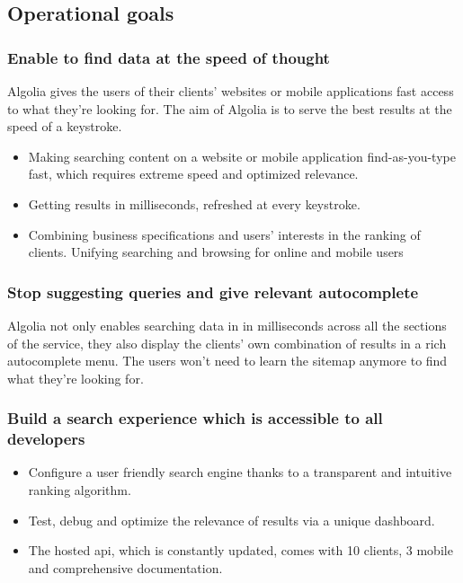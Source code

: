 \subsection{Operational goals}

\subsubsection{Enable to find data at the speed of thought}

Algolia gives the users of their clients' websites or mobile applications fast access to what they’re looking for. The aim of Algolia is to serve the best results at the speed of a keystroke.

\begin{itemize}
  \item Making searching content on a website or mobile application find-as-you-type fast, which requires extreme speed and optimized relevance.
  \item Getting results in milliseconds, refreshed at every keystroke.
  \item Combining business specifications and users' interests in the ranking of clients.
  Unifying searching and browsing for online and mobile users
\end{itemize}

\subsubsection{Stop suggesting queries and give relevant autocomplete}

Algolia not only enables searching data in in milliseconds across all the sections of the service, they also display the clients' own combination of results in a rich autocomplete menu. The users won't need to learn the sitemap anymore to find what they're looking for.

\subsubsection{Build a search experience which is accessible to all developers}

\begin{itemize}
  \item Configure a user friendly search engine thanks to a transparent and intuitive ranking algorithm.
  \item Test, debug and optimize the relevance of results via a unique dashboard.
  \item The hosted \acrshort{api}, which is constantly updated, comes with 10 clients, 3 mobile  and comprehensive documentation.
\end{itemize}

